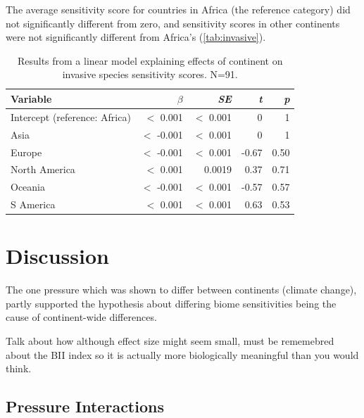 \documentclass[11pt, a4paper, titlepage]{article}
\begin{document}
    The average sensitivity score for countries in Africa (the reference category) did not significantly different from zero, and sensitivity scores in other continents were not significantly different from Africa's (\autoref{tab:invasive}).
	\begin{table}[h!]
		\begin{center}
			\caption{Results from a linear model explaining effects of continent on invasive species sensitivity scores.\textmd{ N=91.}}
			\label{tab:invasive}
			\begin{tabular}{l|r|r|r|r} %
				Variable & $\beta$ & \textit{SE} & \textit{t} & \textit{p}\\
				\hline
				Intercept (reference: Africa) & $<$ 0.001 & $<$ 0.001 & 0 & 1\\
				Asia & $<$ -0.001 & $<$ 0.001 & 0 & 1\\
				Europe & $<$ -0.001 & $<$ 0.001 & -0.67 & 0.50 \\
				North America & $<$ 0.001 & 0.0019 & 0.37 & 0.71\\
				Oceania & $<$ -0.001 & $<$ 0.001 & -0.57 & 0.57\\
				S America & $<$ 0.001 & $<$ 0.001 & 0.63 & 0.53\\
				
			\end{tabular}
		\end{center}
	\end{table}

    \clearpage
    
     \section*{Discussion}
     
     The one pressure which was shown to differ between continents (climate change), partly supported the hypothesis about differing biome sensitivities being the cause of continent-wide differences.
     
     Talk about how although effect size might seem small, must be rememebred about the BII index so it is actually more biologically meaningful than you would think.
     
	\subsection*{Pressure Interactions}
	
\end{document}
